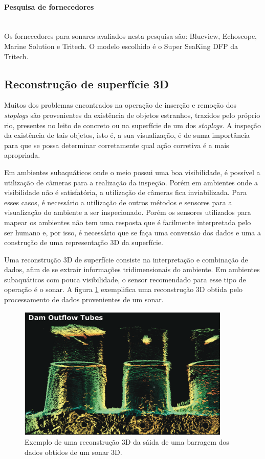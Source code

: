  \paragraph{Pesquisa de fornecedores}\mbox{}\\
 Os fornecedores para sonares avaliados nesta pesquisa são: Blueview, Echoscope,
 Marine Solution e Tritech. O modelo escolhido é o Super SeaKing DFP da Tritech.


\subsection{Reconstrução de superfície 3D}

Muitos dos problemas encontrados na operação de inserção e remoção dos \textit{stoplogs} são provenientes da existência de objetos estranhos, trazidos pelo próprio rio, presentes no leito de concreto ou na superfície de um dos \textit{stoplogs}. A inspeção da existência de tais objetos, isto é, a sua visualização, é de suma importância para que se possa determinar corretamente qual ação corretiva é a mais apropriada.

Em ambientes subaquáticos onde o meio possui uma boa visibilidade, é possível a utilização de câmeras para a realização da inspeção. Porém em ambientes onde a visibilidade não é satisfatória, a utilização de câmeras fica inviabilizada. Para esses casos, é necessário a utilização de outros métodos e sensores para a visualização do ambiente a ser inspecionado. Porém os sensores utilizados para mapear os ambientes não tem uma resposta que é facilmente interpretada pelo ser humano e, por isso, é necessário que se faça uma conversão dos dados e uma a construção de uma representação 3D da superfície.

Uma reconstrução 3D de superfície consiste na interpretação e combinação de dados, afim de se extrair informações tridimensionais do ambiente. Em ambientes subaquáticos com pouca visibilidade, o sensor recomendado para esse tipo de operação é o sonar. A figura \ref{figs/3d/3dcomporta} exemplifica uma reconstrução 3D obtida pelo processamento de dados provenientes de um sonar.
\begin{figure}[H]
    \centering
    \includegraphics[width=0.9\textwidth]{figs/3d/3dcomporta}
    \caption{Exemplo de uma reconstrução 3D da sáida de uma barragem dos dados obtidos de um sonar 3D.}
    \label{figs/3d/3dcomporta}
\end{figure}



